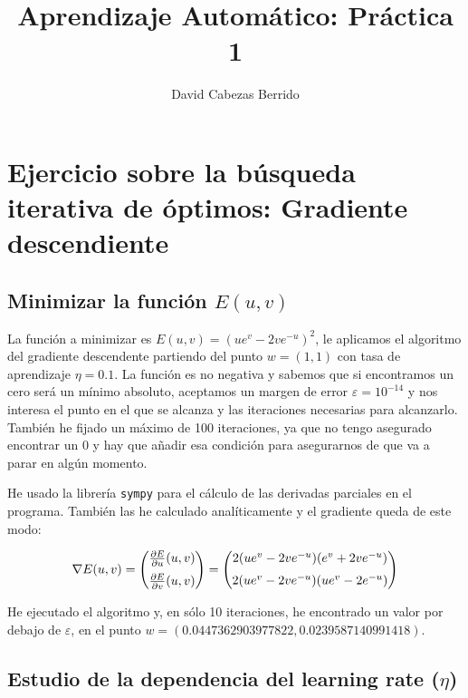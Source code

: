 \documentclass[a4]{article}
\author{David Cabezas Berrido}
\date{\vspace{-5mm}}
\title{\huge Aprendizaje Automático: Práctica 1 \HRule\vspace{-4mm}}
\begin{document}
\maketitle
\tableofcontents

\newpage

\section{Ejercicio sobre la búsqueda iterativa de óptimos: Gradiente descendiente}

\subsection{Minimizar la función $E(u,v)$}

La función a minimizar es $E(u,v)=(ue^v-2ve^{-u})^2$, le aplicamos el algoritmo del gradiente 
descendente partiendo del punto $w=(1,1)$ con tasa de aprendizaje $\eta=0.1$.
La función es no negativa y sabemos que si encontramos un cero será un mínimo absoluto,
aceptamos un margen de error $\varepsilon=10^{-14}$ y nos interesa el punto en el que se alcanza
y las iteraciones necesarias para alcanzarlo. También he fijado un máximo de 100 iteraciones,
ya que no tengo asegurado encontrar un 0 y hay que añadir esa condición para asegurarnos
de que va a parar en algún momento.

He usado la librería \texttt{sympy} para el cálculo de las derivadas parciales en el programa.
También las he calculado analíticamente y el gradiente queda de este modo:

\begin{equation*}
\nabla E(u,v)=
\begin{pmatrix}
\frac{\partial E}{\partial u}(u,v) \vspace{2mm}\\
\frac{\partial E}{\partial v}(u,v)
\end{pmatrix}=
\begin{pmatrix}
    2(ue^v-2ve^{-u})(e^v+2ve^{-u}) \vspace{2mm}\\
    2(ue^v-2ve^{-u})(ue^v-2e^{-u})
    \end{pmatrix}
\end{equation*}

He ejecutado el algoritmo y, en sólo 10 iteraciones, he encontrado un valor por debajo de $\varepsilon$,
en el punto $w=(0.0447362903977822,0.0239587140991418)$.

\subsection{Estudio de la dependencia del \textbf{learning rate} ($\eta$)}
\end{document}
